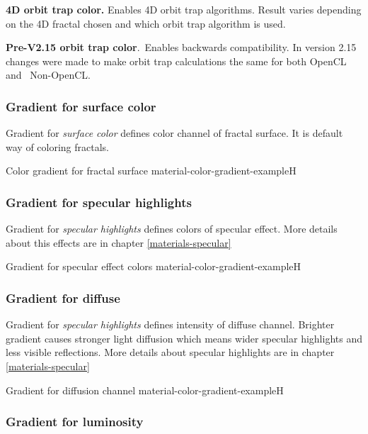 \textbf{4D orbit trap color.} Enables 4D orbit trap algorithms. Result varies depending on the 4D fractal chosen and which orbit trap algorithm is used.

\textbf{Pre-V2.15 orbit trap color}. Enables backwards compatibility. In version 2.15 changes were made to make orbit trap calculations the same for both OpenCL and  Non-OpenCL.

\subsubsection{Gradient for surface color}\label{materials-surface_color-gradient}

Gradient for \emph{surface color} defines color channel of fractal surface. It is default way of coloring fractals.

{Color gradient for fractal surface}
{material-color-gradient-example}{H}

\subsubsection{Gradient for specular highlights}\label{materials-specular-gradient}

Gradient for \emph{specular highlights} defines colors of specular effect. More details about this effects are in chapter \ref{materials-specular}

{Gradient for specular effect colors}
{material-color-gradient-example}{H}

\subsubsection{Gradient for diffuse}\label{materials-diffuse-gradient}

Gradient for \emph{specular highlights} defines intensity of diffuse channel. Brighter gradient causes stronger light diffusion which means wider specular highlights and less visible reflections. More details about specular highlights are in chapter \ref{materials-specular}

{Gradient for diffusion channel}
{material-color-gradient-example}{H}

\subsubsection{Gradient for luminosity}\label{materials-luminosity-gradient}

